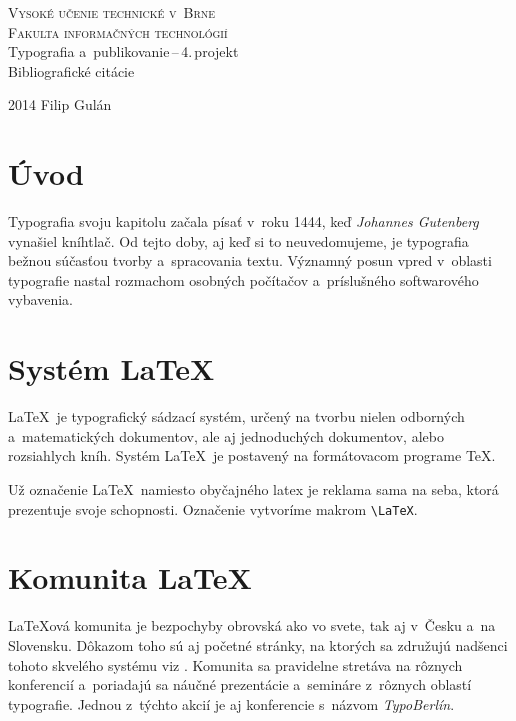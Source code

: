 \documentclass[11pt,a4paper,titlepage]{article}
\begin{document}
\begin{titlepage}
\begin{center}
    {\textsc{\Huge Vysoké učenie technické v~Brne}}\\
    \smallskip
    {\huge\textsc{Fakulta informačných technológií}}\\
    \bigskip
    \LARGE{Typografia a~publikovanie\,--\,4.\,projekt}\\
    \smallskip
    \Huge{Bibliografické citácie}\\
\end{center}
    {\Large 2014 \hfill Filip Gulán }
\end{titlepage}

\section{Úvod}
Typografia svoju kapitolu začala písať v~roku 1444, keď \textit{Johannes Gutenberg} vynašiel kníhtlač. Od tejto doby, aj keď si to neuvedomujeme, je typografia bežnou súčasťou tvorby a~spracovania textu. Významný posun vpred v~oblasti typografie nastal rozmachom osobných počítačov a~príslušného softwarového vybavenia.\cite{Rybicka}


\section{Systém \LaTeX}
\LaTeX \ je typografický sádzací systém, určený na tvorbu nielen odborných a~matematických dokumentov, ale aj jednoduchých dokumentov, alebo rozsiahlych kníh. Systém \LaTeX \ je postavený na formátovacom programe \TeX. \cite{Helmut} 

Už označenie \LaTeX \ namiesto obyčajného latex je reklama sama na seba, ktorá prezentuje svoje schopnosti. Označenie vytvoríme makrom \verb|\LaTeX|. \cite{Spec} 

\section{Komunita \LaTeX}
\LaTeX ová komunita je bezpochyby obrovská ako vo svete, tak aj v~Česku a~na Slovensku. Dôkazom toho sú aj početné stránky, na ktorých sa združujú nadšenci tohoto skvelého systému viz \cite{Tug}.
Komunita sa pravidelne stretáva na rôznych konferencií a~poriadajú sa náučné prezentácie a~semináre z~rôznych oblastí typografie. Jednou z~týchto akcií je aj konferencie s~názvom \textit{TypoBerlín}. \cite{Typob}
\end{document}
